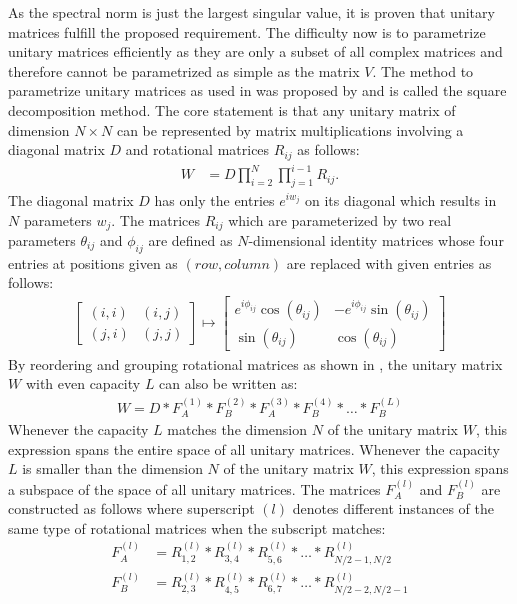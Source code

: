 \documentclass[draft,final]{vutinfth} %
\begin{document}
As the spectral norm is just the largest singular value, it is proven that unitary matrices fulfill the proposed requirement.
The difficulty now is to parametrize unitary matrices efficiently as they are only a subset of all complex matrices and therefore cannot be parametrized as simple as the matrix $V$.
The method to parametrize unitary matrices as used in \cite[p. 3]{EfficientUnitaryRNNs} was proposed by \cite{UnitaryMatrixParametrization} and is called the square decomposition method.
The core statement is that any unitary matrix of dimension $N \times N$ can be represented by matrix multiplications involving a diagonal matrix $D$ and rotational matrices $R_{ij}$ as follows:
\begin{align}
W &= D \prod_{i=2}^N \prod_{j=1}^{i-1} R_{ij}.
\end{align}
The diagonal matrix $D$ has only the entries $e^{iw_j}$ on its diagonal which results in $N$ parameters $w_j$.
The matrices $R_{ij}$ which are parameterized by two real parameters $\theta_{ij}$ and $\phi_{ij}$ are defined as $N$-dimensional identity matrices whose four entries at positions given as $(row,column)$ are replaced with given entries as follows:
\begin{align}
\begin{bmatrix}
(i,i)
& (i,j) \\
(j,i) & (j,j)
\end{bmatrix} \mapsto
\begin{bmatrix}
e^{i\phi_{ij}}\cos (\theta_{ij})  & -e^{i\phi_{ij}}\sin (\theta_{ij}) \\
\sin (\theta_{ij}) & \cos (\theta_{ij})
\end{bmatrix}
\end{align}
By reordering and grouping rotational matrices as shown in \cite[p. 4]{EfficientUnitaryRNNs}, the unitary matrix $W$ with even capacity $L$ can also be written as:
\begin{align}
W = D * F_A^{(1)} * F_B^{(2)} * F_A^{(3)} * F_B^{(4)} * \ldots * F_B^{(L)}
\end{align}
Whenever the capacity $L$ matches the dimension $N$ of the unitary matrix $W$, this expression spans the entire space of all unitary matrices.
Whenever the capacity $L$ is smaller than the dimension $N$ of the unitary matrix $W$, this expression spans a subspace of the space of all unitary matrices.
The matrices $F_A^{(l)}$ and $F_B^{(l)}$ are constructed as follows where superscript $(l)$ denotes different instances of the same type of rotational matrices when the subscript matches:
\begin{align}
F_A^{(l)} &= R_{1,2}^{(l)} * R_{3,4}^{(l)} * R_{5,6}^{(l)} * \ldots * R_{N/2-1,N/2}^{(l)} \\
F_B^{(l)} &= R_{2,3}^{(l)} * R_{4,5}^{(l)} * R_{6,7}^{(l)} * \ldots * R_{N/2-2,N/2-1}^{(l)}
\end{align}
\end{document}
